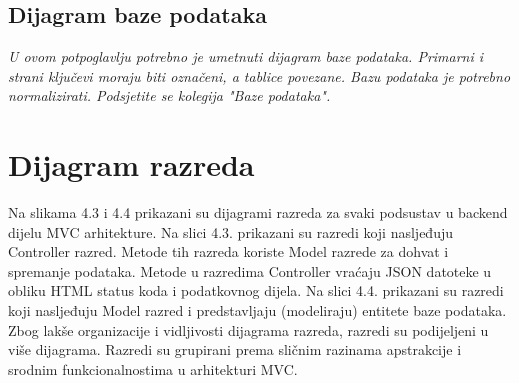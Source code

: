 				
				
			\subsection{Dijagram baze podataka}
				\textit{ U ovom potpoglavlju potrebno je umetnuti dijagram baze podataka. Primarni i strani ključevi moraju biti označeni, a tablice povezane. Bazu podataka je potrebno normalizirati. Podsjetite se kolegija "Baze podataka".}
				
	
			\eject
			
			
		\section{Dijagram razreda}
		
			
			
			Na slikama 4.3 i 4.4 prikazani su dijagrami razreda za svaki podsustav u backend dijelu MVC arhitekture. Na slici 4.3. prikazani su razredi koji nasljeđuju Controller razred. Metode tih razreda koriste Model razrede za dohvat i spremanje podataka. Metode u razredima Controller vraćaju JSON datoteke u obliku HTML status koda i podatkovnog dijela. Na slici 4.4. prikazani su razredi koji nasljeđuju Model razred i predstavljaju (modeliraju) entitete baze podataka.\\
			Zbog lakše organizacije i vidljivosti dijagrama razreda, razredi su podijeljeni u više dijagrama. Razredi su grupirani prema sličnim razinama apstrakcije i srodnim funkcionalnostima u arhitekturi MVC.\\
			
